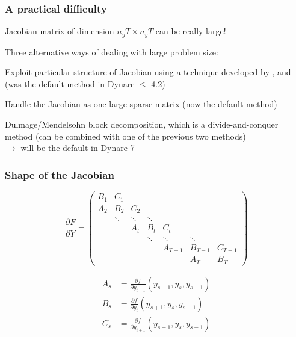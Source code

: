 \documentclass[handout,usepdftitle=false,xcolor=dvipsnames,aspectratio=169]{beamer}
\begin{document}
\begin{frame}
  \frametitle{A practical difficulty}
  \begin{witemize}
    \item   Jacobian matrix of dimension $n_yT\times n_yT$ can be really large!
    \item Three alternative ways of dealing with large problem size:
    \begin{wenumerate}
      \item Exploit particular structure of Jacobian using a technique
      developed by \textcite{Laffargue1990}, \textcite{Boucekkine1995} and \textcite{Juillard1996} (was the default method in
      Dynare $\leq$ 4.2)
      \item Handle the Jacobian as one large sparse matrix (now the default method)
      \item Dulmage/Mendelsohn block decomposition, which is a divide-and-conquer method (can be combined with one of the previous two methods)\\
      $\rightarrow$ will be the default in Dynare 7
    \end{wenumerate}
  \end{witemize}
\end{frame}

\begin{frame}
  \frametitle{Shape of the Jacobian}
  \begin{equation}
    \frac{\partial F}{\partial Y} = \begin{pmatrix}
      B_1 & C_1    &        &        &         &         &         \\
      A_2 & B_2    & C_2    &        &         &         &         \\
          & \ddots & \ddots & \ddots &         &         &         \\
          &        & A_t    & B_t    & C_t     &         &         \\
          &        &        & \ddots & \ddots  & \ddots  &         \\
          &        &        &        & A_{T-1} & B_{T-1} & C_{T-1} \\
          &        &        &        &         & A_T     & B_T
    \end{pmatrix}
  \end{equation}

  \begin{align}
    A_s & = \frac{\partial f}{\partial y_{t-1}}(y_{s+1},y_s,y_{s-1}) \\
    B_s & = \frac{\partial f}{\partial y_t}(y_{s+1},y_s,y_{s-1})     \\
    C_s & = \frac{\partial f}{\partial y_{t+1}}(y_{s+1},y_s,y_{s-1})
  \end{align}
\end{frame}
\end{document}
